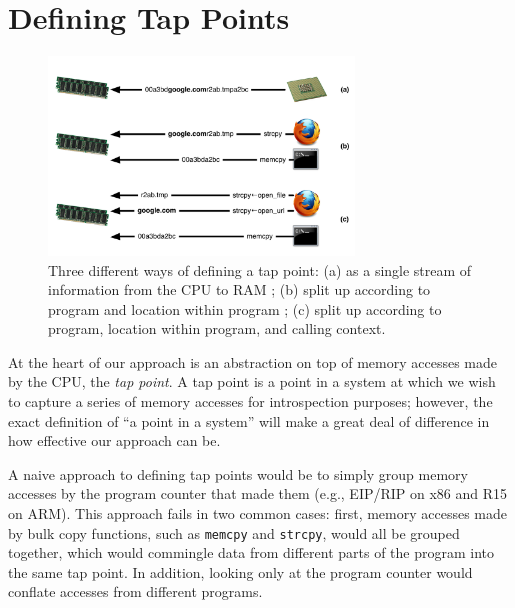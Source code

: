 \section{Defining Tap Points}
\label{sec:tapdef}

\begin{figure}[t]
\begin{center}
\includegraphics[width=3.2in]{tappoint.pdf}
\end{center}
\caption{Three different ways of defining a tap point: (a) as a single
stream of information from the CPU to RAM ; (b) split up according to
program and location within program ; (c) split up according to program,
location within program, and calling context.}
\label{fig:tappoint}
\end{figure}

At the heart of our approach is an abstraction on top of memory accesses
made by the CPU, the \emph{tap point}. A tap point is a point in a
system at which we wish to capture a series of memory accesses for
introspection purposes; however, the exact definition of ``a point in a
system'' will make a great deal of difference in how effective our
approach can be.

A naive approach to defining tap points would be to simply group memory
accesses by the program counter that made them (e.g., EIP/RIP on x86 and
R15 on ARM). This approach fails in two common cases: first, memory
accesses made by bulk copy functions, such as \texttt{memcpy} and
\texttt{strcpy}, would all be grouped together, which would commingle
data from different parts of the program into the same tap point. In
addition, looking only at the program counter would conflate accesses
from different programs.

